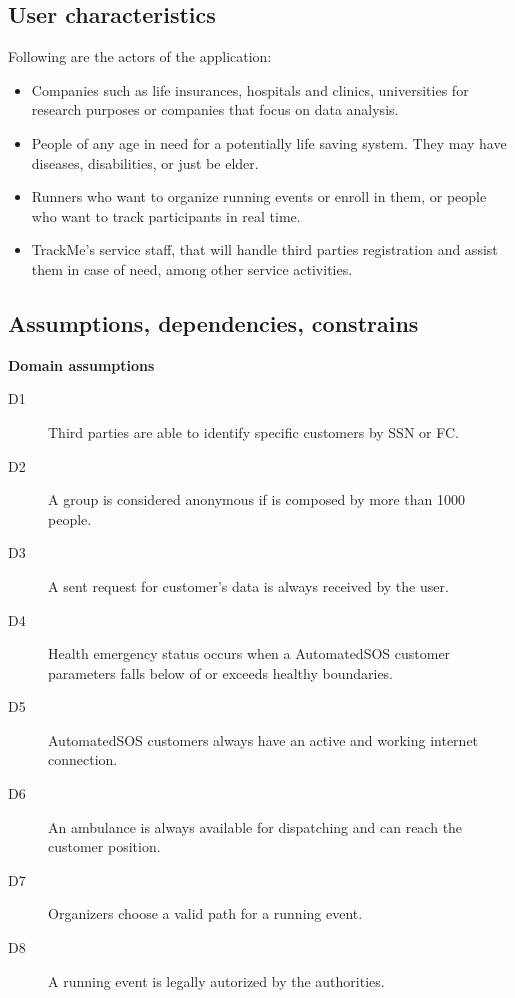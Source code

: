 \documentclass[../main.tex]{subfiles}
\begin{document}
\subsection{User characteristics}
Following are the actors of the application:
\begin{itemize}
	\item Companies such as life insurances, hospitals and clinics, universities for research purposes or companies that focus on data analysis.
	\item People of any age in need for a potentially life saving system. They may have diseases, disabilities, or just be elder.
	\item Runners who want to organize running events or enroll in them, or people who want to track participants in real time.
	\item TrackMe's service staff, that will handle third parties registration and assist them in case of need, among other service activities.
\end{itemize}

\subsection{Assumptions, dependencies, constrains}

{\bf Domain assumptions}

\begin{description}

	\item [D1] Third parties are able to identify specific customers by SSN or FC.
	\item [D2] A group is considered anonymous if is composed by more than 1000 people.
	\item [D3] A sent request for customer's data is always received by the user.
	\item [D4] Health emergency status occurs when a AutomatedSOS customer parameters falls below of or exceeds healthy boundaries.
	\item [D5] AutomatedSOS customers always have an active and working internet connection.
	\item [D6] An ambulance is always available for dispatching and can reach the customer position.
	\item [D7] Organizers choose a valid path for a running event.
	\item [D8] A running event is legally autorized by the authorities.

\end{description}
\end{document}

